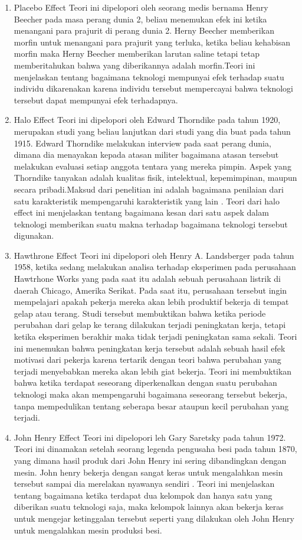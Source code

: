 	\begin{enumerate}
		\item Placebo Effect
			\subitem Teori ini dipelopori oleh seorang medis bernama Henry Beecher pada masa perang dunia 2, beliau menemukan efek ini ketika menangani para prajurit di perang dunia 2. Herny Beecher memberikan morfin untuk menangani para prajurit yang terluka, ketika beliau kehabisan morfin maka Herny Beecher memberikan larutan saline tetapi tetap memberitahukan bahwa yang diberikannya adalah morfin.Teori ini menjelaskan tentang bagaimana teknologi mempunyai efek terhadap suatu individu dikarenakan karena individu tersebut mempercayai bahwa teknologi tersebut dapat mempunyai efek terhadapnya.
		\item Halo Effect
			\subitem Teori ini dipelopori oleh Edward Thorndike pada tahun 1920, merupakan studi yang beliau lanjutkan dari studi yang dia buat pada tahun 1915. Edward Thorndike melakukan interview pada saat perang dunia, dimana dia menayakan kepada atasan militer bagaimana atasan tersebut melakukan evaluasi setiap anggota tentara yang mereka pimpin. Aspek yang Thorndike tanyakan adalah kualitas fisik, intelektual, kepemimpinan, maupun secara pribadi.Maksud dari penelitian ini adalah bagaimana penilaian dari satu karakteristik mempengaruhi karakteristik yang lain . Teori dari halo effect ini menjelaskan tentang bagaimana kesan dari satu aspek dalam teknologi memberikan suatu makna terhadap bagaimana teknologi tersebut digunakan.
		\item Hawthrone Effect
			\subitem Teori ini dipelopori oleh Henry A. Landsberger pada tahun 1958, ketika sedang melakukan analisa terhadap eksperimen pada perusahaan Hawtrhone Works yang pada saat itu adalah sebuah perusahaan listrik di daerah Chicago, Amerika Serikat. Pada saat itu, perusahaan tersebut ingin mempelajari apakah pekerja mereka akan lebih produktif bekerja di tempat gelap atau terang. Studi tersebut membuktikan bahwa ketika periode perubahan dari gelap ke terang dilakukan terjadi peningkatan kerja, tetapi ketika eksperimen berakhir maka tidak terjadi peningkatan sama sekali. Teori ini menemukan bahwa peningkatan kerja tersebut adalah sebuah hasil efek motivasi dari pekerja karena tertarik dengan teori bahwa perubahan yang terjadi menyebabkan mereka akan lebih giat bekerja. Teori ini membuktikan bahwa ketika terdapat seseorang diperkenalkan dengan suatu perubahan teknologi maka akan mempengaruhi bagaimana seseorang tersebut bekerja, tanpa mempedulikan tentang seberapa besar ataupun kecil perubahan yang terjadi.
		\item John Henry Effect
			\subitem Teori ini dipelopori leh Gary Saretsky pada tahun 1972. Teori ini dinamakan setelah seorang legenda pengusaha besi pada tahun 1870, yang dimana hasil produk dari John Henry ini sering dibandingkan dengan mesin. John henry bekerja dengan sangat keras untuk mengalahkan mesin tersebut sampai dia merelakan nyawanya sendiri . Teori ini menjelaskan tentang bagaimana ketika terdapat dua kelompok dan hanya satu yang diberikan suatu teknologi saja, maka kelompok lainnya akan bekerja keras untuk mengejar ketinggalan tersebut seperti yang dilakukan oleh John Henry untuk mengalahkan mesin produksi besi.
	\end{enumerate}
